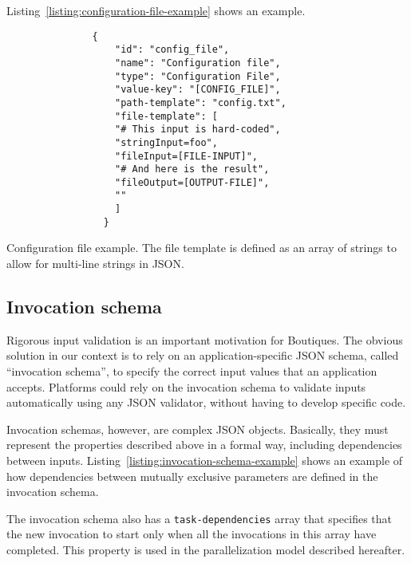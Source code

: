 \documentclass{article}
\begin{document}
Listing~\ref{listing:configuration-file-example} shows an example.
\begin{listing}
\begin{verbatim}
               {
                   "id": "config_file",
                   "name": "Configuration file",
                   "type": "Configuration File",
                   "value-key": "[CONFIG_FILE]",
                   "path-template": "config.txt",
                   "file-template": [
                   "# This input is hard-coded",
                   "stringInput=foo",
                   "fileInput=[FILE-INPUT]",
                   "# And here is the result",
                   "fileOutput=[OUTPUT-FILE]",
                   ""
                   ]
                 }
\end{verbatim}
\caption{Configuration file example. The file template is defined as
  an array of strings to allow for multi-line strings in JSON.}
\label{listing:configuration-file-example}
\end{listing}

\subsection{Invocation schema}
\label{sec:invocation-schema}

Rigorous input validation is an important motivation for
Boutiques. The obvious solution in our context is to rely on an
application-specific JSON schema, called ``invocation schema'', to
specify the correct input values that an application
accepts. Platforms could rely on the invocation schema to validate
inputs automatically using any JSON validator, without having to
develop specific code.

Invocation schemas, however, are complex JSON objects. Basically, they
must represent the properties described above in a formal way,
including dependencies between
inputs. Listing~\ref{listing:invocation-schema-example} shows an
example of how dependencies between mutually exclusive parameters are
defined in the invocation schema.

The invocation schema also has a \texttt{task-dependencies} array that
specifies that the new invocation to start only when all the
invocations in this array have completed. This property is used in the
parallelization model described hereafter.
\end{document}
